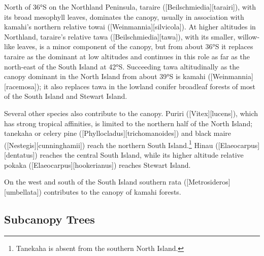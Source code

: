 North of 36°S on the Northland Peninsula, taraire ([Beilschmiedia][tarairi]), with its broad mesophyll leaves, dominates the canopy, usually in association with kamahi's northern relative towai ([Weinmannia][silvicola]).
At higher altitudes in Northland, taraire's relative tawa ([Beilschmiedia][tawa]), with its smaller, willow-like leaves, is a minor component of the canopy, but from about 36°S it replaces taraire as the dominant at low altitudes and continues in this role as far as the north-east of the South Island at 42°S.
Succeeding tawa altitudinally as the canopy dominant in the North Island from about 39°S is kamahi ([Weinmannia][racemosa]); it also replaces tawa in the lowland conifer broadleaf forests of most of the South Island and Stewart Island.

Several other species also contribute to the canopy.
Puriri ([Vitex][lucens]), which has strong tropical affinities, is limited to the northern half of the North Island; tanekaha or celery pine ([Phyllocladus][trichomanoides]) and black maire ([Nestegis][cunninghamii]) reach the northern South Island.\footnote{Tanekaha is absent from the southern North Island.}
Hinau ([Elaeocarpus][dentatus]) reaches the central South Island, while its higher altitude relative pokaka ([Elaeocarpus][hookerianus]) reaches Stewart Island.

On the west and south of the South Island southern rata ([Metrosideros][umbellata]) contributes to the canopy of kamahi forests.

\subsection{Subcanopy Trees}

